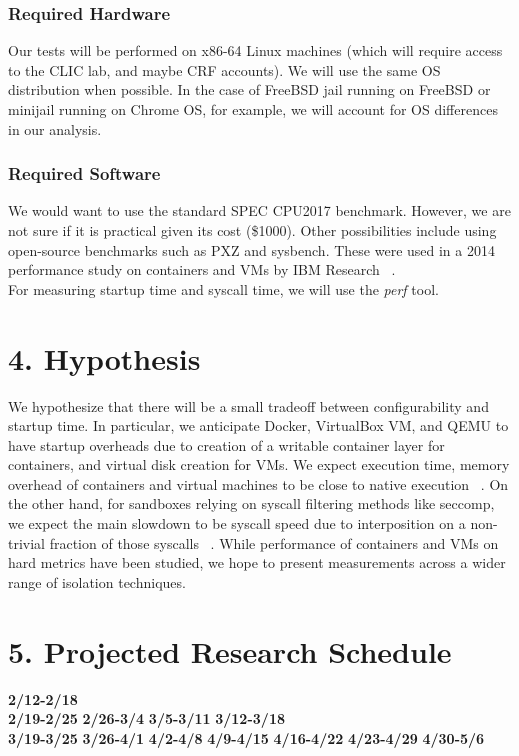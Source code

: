\documentclass{proc}
\begin{document}
\subsubsection*{Required Hardware}
Our tests will be performed on x86-64 Linux machines (which will require access to the CLIC lab, and maybe CRF accounts). We will use the same OS distribution when possible. In the case of FreeBSD jail running on FreeBSD or minijail running on Chrome OS, for example, we will account for OS differences in our analysis. 
\subsubsection*{Required Software}
We would want to use the standard SPEC CPU2017 benchmark. However, we are not sure if it is practical given its cost (\$1000). Other possibilities include using open-source benchmarks such as PXZ and sysbench. These were used in a 2014 performance study on containers and VMs by IBM Research ~\cite{felter2014docker}.\\
For measuring startup time and syscall time, we will use the \emph{perf} tool.
\section*{4. Hypothesis}
We hypothesize that there will be a small tradeoff between configurability and startup time. In particular, we anticipate Docker, VirtualBox VM, and QEMU to have startup overheads due to creation of a writable container layer for containers, and virtual disk creation for VMs. We expect execution time, memory overhead of containers and virtual machines to be close to native execution ~\cite{felter2014docker}. On the other hand, for sandboxes relying on syscall filtering methods like seccomp, we expect the main slowdown to be syscall speed due to interposition on a non-trivial fraction of those syscalls ~\cite{kim2013mbox}. While performance of containers and VMs on hard metrics have been studied, we hope to present measurements across a wider range of isolation techniques.
\section*{5. Projected Research Schedule}
\textbf{2/12-2/18} \\
\textbf{2/19-2/25}
\textbf{2/26-3/4}
\textbf{3/5-3/11}
\textbf{3/12-3/18} \\
\textbf{3/19-3/25}
\textbf{3/26-4/1}
\textbf{4/2-4/8}
\textbf{4/9-4/15}
\textbf{4/16-4/22}
\textbf{4/23-4/29}
\textbf{4/30-5/6}  






\end{document}
